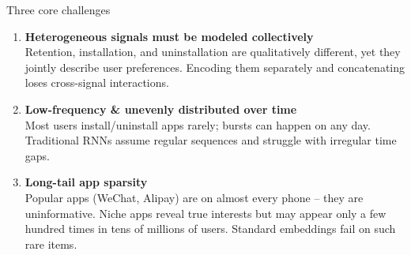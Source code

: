 \documentclass[aspectratio=169,t]{beamer}
\begin{document}
\begin{frame}{Three core challenges}
  \begin{enumerate}
    \item \textbf{Heterogeneous signals must be modeled collectively}\\
      Retention, installation, and uninstallation are qualitatively different, yet they jointly describe user preferences. Encoding them separately and concatenating loses cross-signal interactions.
      \vspace{0.25cm}
    \item \textbf{Low-frequency \& unevenly distributed over time}\\
      Most users install/uninstall apps rarely; bursts can happen on any day. Traditional RNNs assume regular sequences and struggle with irregular time gaps.
      \vspace{0.25cm}
    \item \textbf{Long-tail app sparsity}\\
      Popular apps (WeChat, Alipay) are on almost every phone -- they are uninformative. Niche apps reveal true interests but may appear only a few hundred times in tens of millions of users. Standard embeddings fail on such rare items.
  \end{enumerate}
\end{frame}
\end{document}
